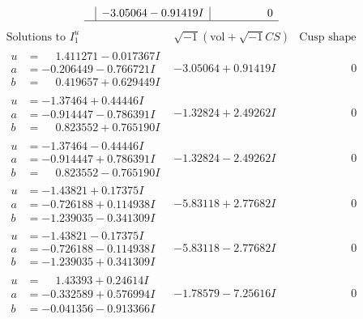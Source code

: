 \documentclass[1p]{elsarticle_modified}
\theoremstyle{definition}
\newcommand{\I}{\sqrt{-1}}
\begin{document}
$$\begin{array}{c|c|c}
 & -3.05064 - 0.91419 I & \phantom{-0.000000 } 0\\
 \hline 
 \end{array}$$\newpage$$\begin{array}{c|c|c}  
\text{Solutions to }I^u_{1}& \I (\text{vol} + \sqrt{-1}CS) & \text{Cusp shape}\\
 \hline 
\begin{aligned}
u &= \phantom{-}1.411271 - 0.017367 I \\
a &= -0.206449 - 0.766721 I \\
b &= \phantom{-}0.419657 + 0.629449 I\end{aligned}
 & -3.05064 + 0.91419 I & \phantom{-0.000000 } 0 \\ \hline\begin{aligned}
u &= -1.37464 + 0.44446 I \\
a &= -0.914447 - 0.786391 I \\
b &= \phantom{-}0.823552 + 0.765190 I\end{aligned}
 & -1.32824 + 2.49262 I & \phantom{-0.000000 } 0 \\ \hline\begin{aligned}
u &= -1.37464 - 0.44446 I \\
a &= -0.914447 + 0.786391 I \\
b &= \phantom{-}0.823552 - 0.765190 I\end{aligned}
 & -1.32824 - 2.49262 I & \phantom{-0.000000 } 0 \\ \hline\begin{aligned}
u &= -1.43821 + 0.17375 I \\
a &= -0.726188 + 0.114938 I \\
b &= -1.239035 - 0.341309 I\end{aligned}
 & -5.83118 + 2.77682 I & \phantom{-0.000000 } 0 \\ \hline\begin{aligned}
u &= -1.43821 - 0.17375 I \\
a &= -0.726188 - 0.114938 I \\
b &= -1.239035 + 0.341309 I\end{aligned}
 & -5.83118 - 2.77682 I & \phantom{-0.000000 } 0 \\ \hline\begin{aligned}
u &= \phantom{-}1.43393 + 0.24614 I \\
a &= -0.332589 + 0.576994 I \\
b &= -0.041356 - 0.913366 I\end{aligned}
 & -1.78579 - 7.25616 I & \phantom{-0.000000 } 0 \\ \hline\begin{aligned}

\end{aligned}
\end{array}$$
\end{document}
